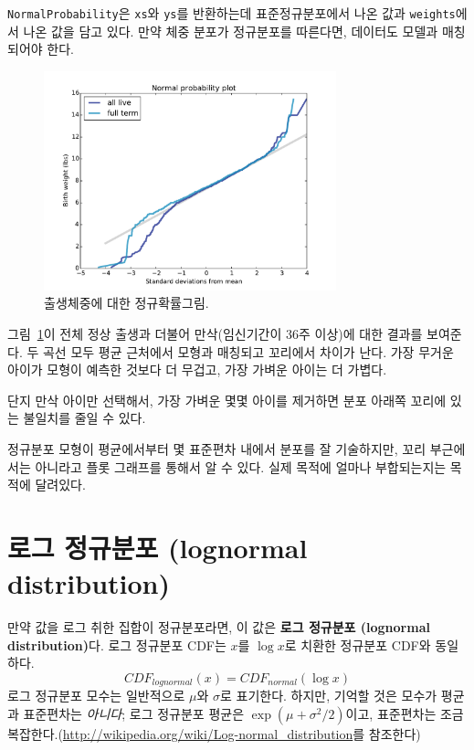 {\tt NormalProbability}은 {\tt xs}와 {\tt ys}를 반환하는데 
표준정규분포에서 나온 값과 {\tt weights}에서 나온 값을 담고 있다.
만약 체중 분포가 정규분포를 따른다면, 데이터도 모델과 매칭되어야 한다.


\begin{figure}
\centerline{\includegraphics[height=2.5in]{figs/analytic_birthwgt_normal.pdf}}
\caption{출생체중에 대한 정규확률그림.}
\label{analytic_birthwgt_normal}
\end{figure}

그림~\ref{analytic_birthwgt_normal}이 전체 정상 출생과 더불어 만삭(임신기간이 36주 이상)에 대한 결과를 보여준다.
두 곡선 모두 평균 근처에서 모형과 매칭되고 꼬리에서 차이가 난다.
가장 무거운 아이가 모형이 예측한 것보다 더 무겁고, 가장 가벼운 아이는 더 가볍다.


단지 만삭 아이만 선택해서, 가장 가벼운 몇몇 아이를 제거하면 분포 아래쪽 꼬리에 있는 불일치를 줄일 수 있다.

정규분포 모형이 평균에서부터 몇 표준편차 내에서 분포를 잘 기술하지만, 꼬리 부근에서는 아니라고 플롯 그래프를 통해서 알 수 있다.
실제 목적에 얼마나 부합되는지는 목적에 달려있다.


\section{로그 정규분포 (lognormal distribution)}
\label{brfss}
\label{lognormal}

만약 값을 로그 취한 집합이 정규분포라면, 이 값은 {\bf 로그 정규분포 (lognormal distribution)}다. 로그 정규분포 CDF는 $x$를 $\log x$로 치환한 정규분포 CDF와 동일하다.
%
\[ CDF_{lognormal}(x) = CDF_{normal}(\log x)\]
%
로그 정규분포 모수는 일반적으로 $\mu$와 $\sigma$로 표기한다.
하지만, 기억할 것은 모수가 평균과 표준편차는 {\em 아니다};
로그 정규분포 평균은 $\exp(\mu +\sigma^2/2)$이고, 표준편차는 조금 복잡한다.(\url{http://wikipedia.org/wiki/Log-normal_distribution}를 참조한다)

